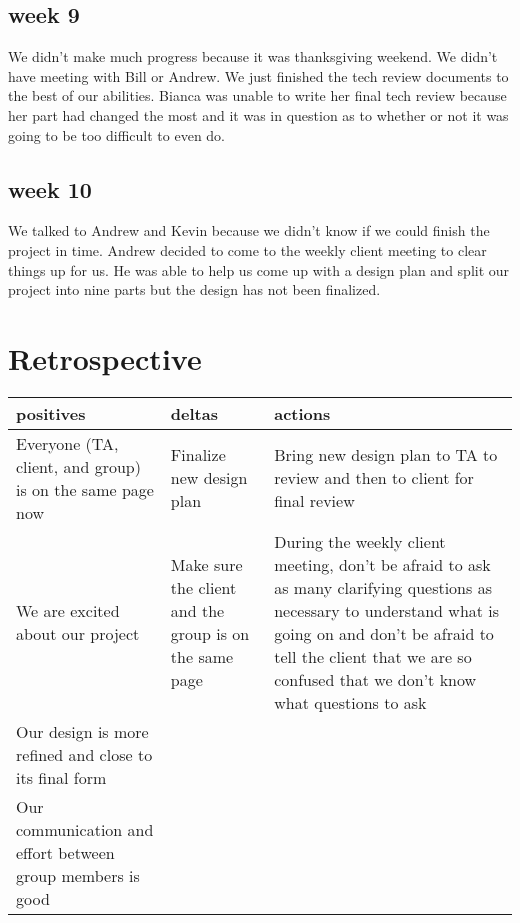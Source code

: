 \documentclass[onecolumn, draftclsnofoot,10pt, compsoc]{IEEEtran}
\begin{document}
\subsection{week 9}
We didn’t make much progress because it was thanksgiving weekend. We didn’t have meeting with Bill or Andrew. We just finished the tech review documents to the best of our abilities. Bianca was unable to write her final tech review because her part had changed the most and it was in question as to whether or not it was going to be too difficult to even do. 

\subsection{week 10}
We talked to Andrew and Kevin because we didn’t know if we could finish the project in time. Andrew decided to come to the weekly client meeting to clear things up for us. He was able to help us come up with a design plan and split our project into nine parts but the design has not been finalized. 

\section{Retrospective }

\begin{tabular}{|p{5cm} | p{5cm} | p{5cm}|} 
	\hline
	positives  & deltas  & actions \\ [0.5ex] 
	\hline\hline
	Everyone (TA, client, and group) is on the same page now & Finalize new design plan & Bring new design plan to TA to review and then to client for final review\\
	\hline
	We are excited about our project & Make sure the client and the group is on the same page & During the weekly client meeting, don’t be afraid to ask as many clarifying questions as necessary to understand what is going on and don’t be afraid to tell the client that we are so confused that we don’t know what questions to ask \\
	\hline
	Our design is more refined and close to its final form &  &  \\
	\hline  
	Our communication and effort between group members is good &  & \\
	\hline

	
\end{tabular}




\end{document}
